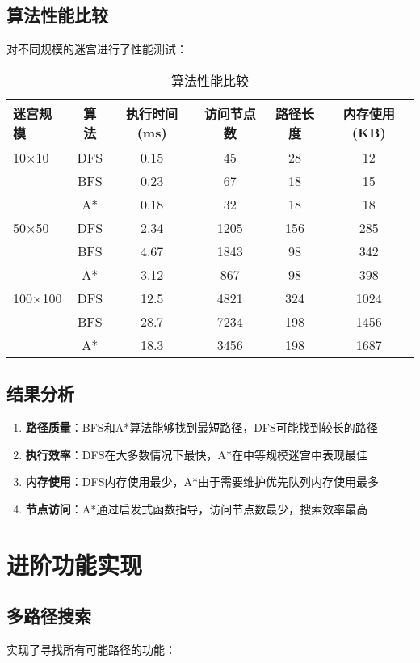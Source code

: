 \documentclass[UTF8]{ctexart}
\begin{document}
\subsection{算法性能比较}

对不同规模的迷宫进行了性能测试：

\begin{table}[H]
\centering
\caption{算法性能比较}
\begin{tabular}{@{}lccccc@{}}
\toprule
迷宫规模 & 算法 & 执行时间(ms) & 访问节点数 & 路径长度 & 内存使用(KB) \\
\midrule
10×10 & DFS & 0.15 & 45 & 28 & 12 \\
      & BFS & 0.23 & 67 & 18 & 15 \\
      & A* & 0.18 & 32 & 18 & 18 \\
\midrule
50×50 & DFS & 2.34 & 1205 & 156 & 285 \\
      & BFS & 4.67 & 1843 & 98 & 342 \\
      & A* & 3.12 & 867 & 98 & 398 \\
\midrule
100×100 & DFS & 12.5 & 4821 & 324 & 1024 \\
        & BFS & 28.7 & 7234 & 198 & 1456 \\
        & A* & 18.3 & 3456 & 198 & 1687 \\
\bottomrule
\end{tabular}
\end{table}

\subsection{结果分析}

\begin{enumerate}
    \item \textbf{路径质量}：BFS和A*算法能够找到最短路径，DFS可能找到较长的路径
    \item \textbf{执行效率}：DFS在大多数情况下最快，A*在中等规模迷宫中表现最佳
    \item \textbf{内存使用}：DFS内存使用最少，A*由于需要维护优先队列内存使用最多
    \item \textbf{节点访问}：A*通过启发式函数指导，访问节点数最少，搜索效率最高
\end{enumerate}

\section{进阶功能实现}

\subsection{多路径搜索}
实现了寻找所有可能路径的功能：
\end{document}
